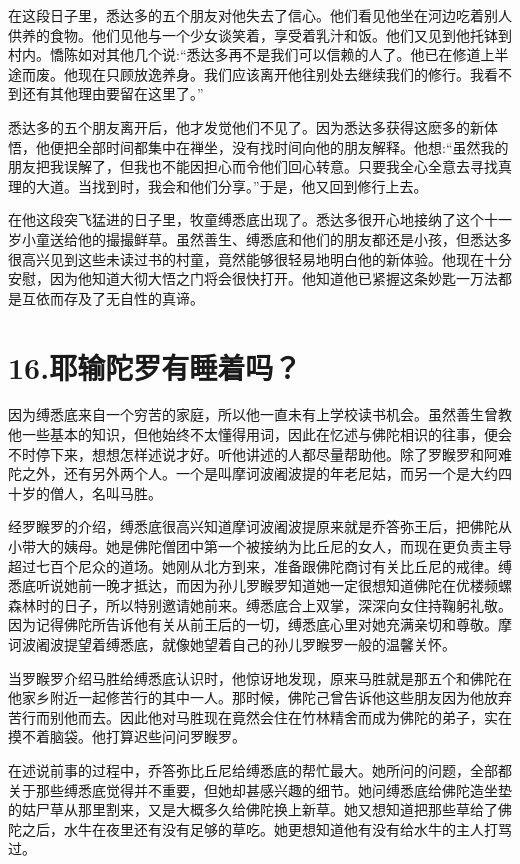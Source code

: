 \documentclass[12pt,twoside,openany]{book}
\begin{document}
在这段日子里，悉达多的五个朋友对他失去了信心。他们看见他坐在河边吃着别人供养的食物。他们见他与一个少女谈笑着，享受着乳汁和饭。他们又见到他托钵到村内。憍陈如对其他几个说:“悉达多再不是我们可以信赖的人了。他已在修道上半途而废。他现在只顾放逸养身。我们应该离开他往别处去继续我们的修行。我看不到还有其他理由要留在这里了。”

悉达多的五个朋友离开后，他才发觉他们不见了。因为悉达多获得这麽多的新体悟，他便把全部时间都集中在禅坐，没有找时间向他的朋友解释。他想:“虽然我的朋友把我误解了，但我也不能因担心而令他们回心转意。只要我全心全意去寻找真理的大道。当找到时，我会和他们分享。”于是，他又回到修行上去。

在他这段突飞猛进的日子里，牧童缚悉底出现了。悉达多很开心地接纳了这个十一岁小童送给他的撮撮鲜草。虽然善生、缚悉底和他们的朋友都还是小孩，但悉达多很高兴见到这些未读过书的村童，竟然能够很轻易地明白他的新体验。他现在十分安慰，因为他知道大彻大悟之门将会很快打开。他知道他已紧握这条妙匙一万法都是互依而存及了无自性的真谛。


\chapter{16.耶输陀罗有睡着吗？}\label{ch16}

因为缚悉底来自一个穷苦的家庭，所以他一直未有上学校读书机会。虽然善生曾教他一些基本的知识，但他始终不太懂得用词，因此在忆述与佛陀相识的往事，便会不时停下来，想想怎样述说才好。听他讲述的人都尽量帮助他。除了罗睺罗和阿难陀之外，还有另外两个人。一个是叫摩诃波阇波提的年老尼姑，而另一个是大约四十岁的僧人，名叫马胜。

经罗睺罗的介绍，缚悉底很高兴知道摩诃波阇波提原来就是乔答弥王后，把佛陀从小带大的姨母。她是佛陀僧团中第一个被接纳为比丘尼的女人，而现在更负责主导超过七百个尼众的道场。她刚从北方到来，准备跟佛陀商讨有关比丘尼的戒律。缚悉底听说她前一晚才抵达，而因为孙儿罗睺罗知道她一定很想知道佛陀在优楼频螺森林时的日子，所以特别邀请她前来。缚悉底合上双掌，深深向女住持鞠躬礼敬。因为记得佛陀所告诉他有关从前王后的一切，缚悉底心里对她充满亲切和尊敬。摩诃波阇波提望着缚悉底，就像她望着自己的孙儿罗睺罗一般的温馨关怀。

当罗睺罗介绍马胜给缚悉底认识时，他惊讶地发现，原来马胜就是那五个和佛陀在他家乡附近一起修苦行的其中一人。那时候，佛陀己曾告诉他这些朋友因为他放弃苦行而别他而去。因此他对马胜现在竟然会住在竹林精舍而成为佛陀的弟子，实在摸不着脑袋。他打算迟些问问罗睺罗。

在述说前事的过程中，乔答弥比丘尼给缚悉底的帮忙最大。她所问的问题，全部都关于那些缚悉底觉得并不重要，但她却甚感兴趣的细节。她问缚悉底给佛陀造坐垫的姑尸草从那里割来，又是大概多久给佛陀换上新草。她又想知道把那些草给了佛陀之后，水牛在夜里还有没有足够的草吃。她更想知道他有没有给水牛的主人打骂过。
\end{document}
